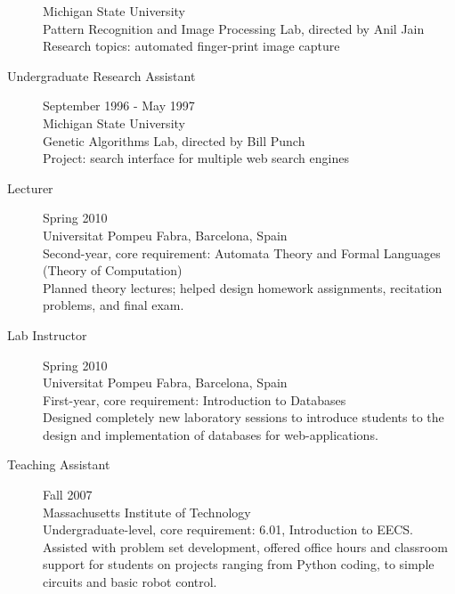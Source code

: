 \documentclass[overlapped,line,letterpaper]{res}
\makeatletter
\def\section{\@ifnextchar*\@@section@star\@@section}
\def\@@section@star*{\@@section}
\makeatother
\begin{document}
\begin{resume}
\begin{description}
Michigan State University\\
Pattern Recognition and Image Processing Lab, directed by Anil Jain \\
Research topics: automated finger-print image capture
\item [Undergraduate Research Assistant] \dotfill September 1996 - May 1997\\
Michigan State University\\
Genetic Algorithms Lab, directed by Bill Punch\\
 Project: search interface for multiple web search engines
\end{description}



\section{Teaching Experience}


\begin{description}
\item [Lecturer] \dotfill Spring 2010 \\
Universitat Pompeu Fabra, Barcelona, Spain\\
Second-year, core requirement: Automata Theory and Formal Languages (Theory of Computation)\\
Planned theory lectures; helped design homework assignments, recitation problems, and final exam.
\item [Lab Instructor] \dotfill Spring 2010 \\
Universitat Pompeu Fabra, Barcelona, Spain\\
First-year, core requirement: Introduction to Databases\\
Designed completely new laboratory sessions to introduce students to the design and implementation of databases for web-applications.
\item [Teaching Assistant] \dotfill  Fall 2007\\
Massachusetts Institute of Technology\\
Undergraduate-level, core requirement: 6.01, Introduction to EECS.\\
Assisted with problem set development, offered office hours and classroom support for students on projects ranging from Python coding, to simple circuits and basic robot control.



\end{description}
\end{resume}
\end{document}

